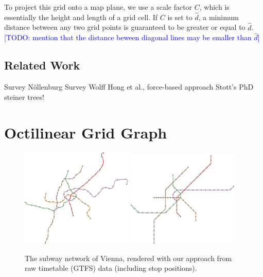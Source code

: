 \documentclass{sig-alternate-sigmod09}
\newcommand\TODO[1]{\textcolor{blue}{\small [TODO: #1]}}
\begin{document}
To project this grid onto a map plane, we use a scale factor $C$, which is essentially the height and length of a grid cell.
If $C$ is set to $\hat d$, a minimum distance between any two grid points is guaranteed to be greater or equal to $\hat d$.
\TODO{mention that the distance beween diagonal lines may be smaller than $\hat d$}

\subsection{Related Work}

Survey Nöllenburg %
Survey Wolff %
Hong et al., force-based approach
Stott's PhD
steiner trees! %

\section{Octilinear Grid Graph}

\begin{figure}[t]
  \centering
	\includegraphics[width=0.474\textwidth]{figures/octi_input.pdf}
	\includegraphics[width=0.474\textwidth]{figures/octi.pdf}
	\caption{The subway network of Vienna, rendered with our approach from raw timetable (GTFS) data (including stop positions).}
	\label{FIG:examplewien}
\end{figure}
\end{document}
